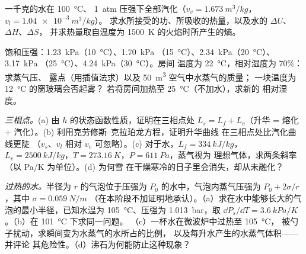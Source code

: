\begin{exercise}[$\star\star$]\label{exo:b1:phase-changes:8}
一千克的水在 \qty{100}{\degreeCelsius}、
\qty{1}{atm} 压强下全部汽化（$v_v = \qty{1.673}{m^3/kg}$，$v_l = \qty{1.04e-3}{m^3/kg}$）。
求水所接受的功、所吸收的热量，以及水的 $\Delta U$、$\Delta H$、$\Delta S$，
并求热量取自温度为
\qty{1500}{K} 的火焰时所产生的熵。
\end{exercise}

\begin{exercise}[$\star\star$]\label{exo:b1:phase-changes:9}
饱和压强：\qty{1.23}{kPa}（\qty{10}{\degreeCelsius}）、\qty{1.70}{kPa}
（\qty{15}{\degreeCelsius}）、\qty{2.34}{kPa}（\qty{20}{\degreeCelsius}）、\qty{3.17}{kPa}
（\qty{25}{\degreeCelsius}）、\qty{4.24}{kPa}（\qty{30}{\degreeCelsius}）。房间
温度为 \qty{22}{\degreeCelsius}，相对湿度为 $70\%$：求蒸气压、
露点（用插值法求）以及 \qty{50}{m^3} 空气中水蒸气的质量；
一块温度为 \qty{12}{\degreeCelsius} 的窗玻璃会否起雾？
若将房间加热至 \qty{25}{\degreeCelsius}（不加水），求新的
相对湿度。
\end{exercise}

\begin{exercise}[$\star\star\star$]\label{exo:b1:phase-changes:10}
\emph{三相点。}(a) 由 $h$ 的状态函数性质，证明在三相点处
$L_s = L_f + L_v$（升华 = 熔化 +
汽化）。(b) 利用克劳修斯–克拉珀龙方程，证明升华曲线
在三相点处比汽化曲线更陡
（$v_s$、$v_l$ 相对 $v_v$ 可忽略）。(c) 对于水，$L_f = \qty{334}{kJ/kg}$，
$L_v = \qty{2500}{kJ/kg}$，$T = \qty{273.16}{K}$，$P = \qty{611}{Pa}$，蒸气视为
理想气体，求两条斜率（以 \unit{Pa/K} 为单位）。(d) 为何雪
在干燥寒冷的日子里会消失，却从未融化？
\end{exercise}

\begin{exercise}[$\star\star\star$]\label{exo:b1:phase-changes:11}
\emph{过热的水。}半径为 $r$ 的气泡位于压强为
$P_0$ 的水中，气泡内蒸气压强为 $P_0 + 2\sigma/r$，其中 $\sigma = \qty{0.059}{N/m}$
（在本阶段不加证明地承认）。（a）求在水中能够长大的气泡的最小半径，已知水温为
\qty{105}{\degreeCelsius}、压强为 \qty{1.013}{bar}，取
$\dd P_s/\dd T = \qty{3.6}{kPa/K}$。（b）在 \qty{101}{\degreeCelsius} 下求同一问题。
（c）一杯水在微波炉中过热至 \qty{105}{\degreeCelsius}，
被勺子扰动，求瞬间变为水蒸气的水所占的比例，
以及每升水产生的水蒸气体积——并评论
其危险性。（d）沸石为何能防止这种现象？
\end{exercise}

